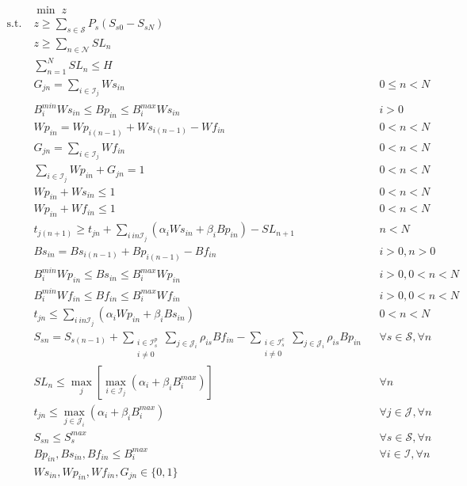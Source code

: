 \begin{align}
&\min \; z &&\\
\text{s.t.}\; &z \ge \sum_{s\in \mathcal{S}} P_s (S_{s0} - S_{sN}) && \\
		  & z \ge \sum_{n\in \mathcal{N}} SL_n  &&\\
		  & \sum_{n=1}^N SL_n \le H &&\\
		  & G_{jn} = \sum_{i \in \mathcal{I}_j} Ws_{in} && 0 \le n < N \\
		  & B_{i}^{min} Ws_{in} \le Bp_{in} \le B_{i}^{max} Ws_{in} && i > 0\\
		  & Wp_{in} = Wp_{i(n-1)} + Ws_{i(n-1)} - Wf_{in} && 0 < n < N \\
		  & G_{jn} = \sum_{i \in \mathcal{I}_j} Wf_{in}  && 0 < n < N \\
		  & \sum_{i \in \mathcal{I}_j} Wp_{in} + G_{jn} = 1 && 0 < n < N \\
		  & Wp_{in}  +Ws_{in} \le 1 && 0 < n < N \\
		  & Wp_{in} + Wf_{in} \le 1 && 0 < n < N \\
		  & t_{j(n+1)} \ge t_{jn} + \sum_{i \ in \mathcal{I}_j} (\alpha_i Ws_{in} + \beta_i Bp_{in}) - SL_{n+1} && n < N \\
		  & Bs_{in} = Bs_{i(n-1)} + Bp_{i(n-1)} - Bf_{in}  && i > 0, n > 0 \\
		  & B_{i}^{min} Wp_{in} \le Bs_{in} \le B_{i}^{max} Wp_{in} && i > 0, 0 < n < N \\
		  & B_{i}^{min} Wf_{in} \le Bf_{in} \le B_{i}^{max} Wf_{in} && i > 0, 0 < n < N \\ 
		  & t_{jn} \le \sum_{i \ in  \mathcal{I}_j} (\alpha_i Wp_{in} + \beta_i Bs_{in})  && 0 < n < N \\
		  & S_{sn} = S_{s(n-1)} + \sum_{\substack{i\in \mathcal{I}_{s}^p\\ i \ne 0}} \sum_{j \in \mathcal{J}_i} \rho_{is} Bf_{in} -   \sum_{\substack{i\in \mathcal{I}_{s}^c\\ i \ne 0}} \sum_{j \in \mathcal{J}_i} \rho_{is} Bp_{in} &&\forall s \in \mathcal{S}, \forall n \\
		  & SL_n \le \max_j \left[\max_{i \in \mathcal{I}_j} (\alpha_i + \beta_i B_{i}^{max}) \right] && \forall n \\
		  & t_{jn} \le \max_{j \in \mathcal{J}_i} (\alpha_i + \beta_i B_{i}^{max}) && \forall j \in \mathcal{J}, \forall n \\
		  & S_{sn} \le S_{s}^{max} && \forall s \in \mathcal{S} , \forall n \\
		  & Bp_{in}, Bs_{in}, Bf_{in} \le B_{i}^{max} && \forall i \in \mathcal{I}, \forall n \\
		  & Ws_{in}, Wp_{in}, Wf_{in}, G_{jn} \in \{0,1\}
\end{align}